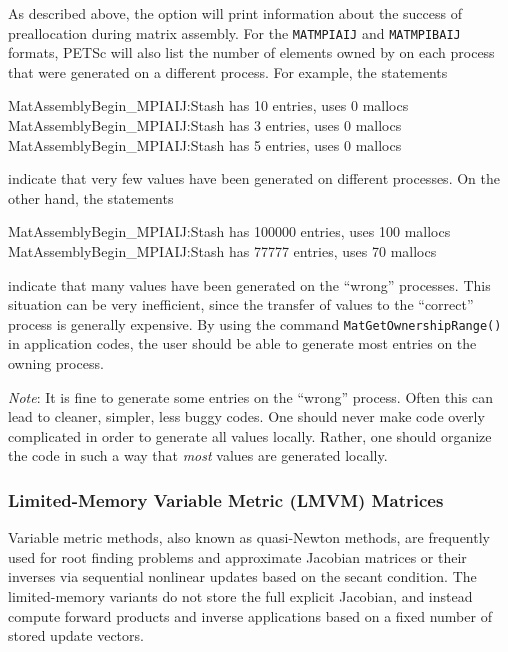 As described above, the option  
will print information about the success of preallocation during
matrix assembly.  For the \lstinline{MATMPIAIJ} and \lstinline{MATMPIBAIJ} formats, PETSc will also list
the number of elements owned by on each process that were generated
on a different process.  For example, the statements
\begin{outputlisting}
MatAssemblyBegin_MPIAIJ:Stash has 10 entries, uses 0 mallocs
MatAssemblyBegin_MPIAIJ:Stash has 3 entries, uses 0 mallocs
MatAssemblyBegin_MPIAIJ:Stash has 5 entries, uses 0 mallocs
\end{outputlisting}
indicate that very few values have been generated on different processes.
On the other hand, the statements
\begin{outputlisting}
MatAssemblyBegin_MPIAIJ:Stash has 100000 entries, uses 100 mallocs
MatAssemblyBegin_MPIAIJ:Stash has 77777 entries, uses 70 mallocs
\end{outputlisting}
indicate that many values have been generated on the ``wrong'' processes.
This situation can be very inefficient, since the transfer of values
to the ``correct'' process is generally expensive.  By using the command
\lstinline{MatGetOwnershipRange()} in application codes, the user should be able
to generate most entries on the owning process.

{\em Note}: It is fine to generate some entries on the ``wrong'' process. Often
this can lead to cleaner, simpler, less buggy codes.  One should never
make code overly complicated in order to generate all values locally. Rather,
one should organize the code in such a way that {\em most} values are generated locally.

\subsubsection{Limited-Memory Variable Metric (LMVM) Matrices}

Variable metric methods, also known as quasi-Newton methods, are frequently used for root finding problems
and approximate Jacobian matrices or their inverses via sequential nonlinear updates based on the secant condition.
The limited-memory variants do not store the full explicit Jacobian, and instead compute forward products and
inverse applications based on a fixed number of stored update vectors.

